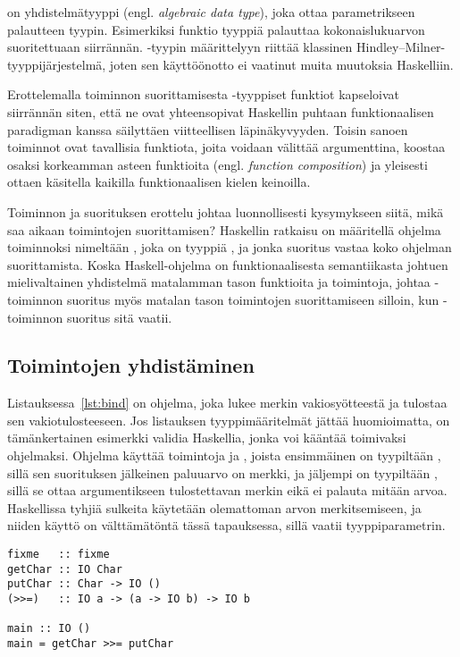 \documentclass[finnish]{tktltiki2}
\begin{document}
 on yhdistelmätyyppi (engl. \emph{algebraic data type}), joka ottaa parametrikseen
palautteen tyypin. Esimerkiksi funktio tyyppiä  palauttaa kokonaislukuarvon
suoritettuaan siirrännän. -tyypin määrittelyyn riittää klassinen
Hindley--Milner-tyyppijärjestelmä, joten sen käyttöönotto ei vaatinut muita muutoksia Haskelliin.

Erottelemalla toiminnon suorittamisesta -tyyppiset funktiot kapseloivat siirrännän siten,
että ne ovat yhteensopivat Haskellin puhtaan funktionaalisen paradigman kanssa säilyttäen
viitteellisen läpinäkyvyyden. Toisin sanoen toiminnot ovat tavallisia funktiota, joita voidaan
välittää argumenttina, koostaa osaksi korkeamman asteen funktioita (engl. \emph{function
composition}) ja yleisesti ottaen käsitella kaikilla funktionaalisen kielen keinoilla.

Toiminnon ja suorituksen erottelu johtaa luonnollisesti kysymykseen siitä, mikä saa aikaan
toimintojen suorittamisen? Haskellin ratkaisu on määritellä ohjelma toiminnoksi nimeltään
, joka on tyyppiä , ja jonka suoritus vastaa koko ohjelman suorittamista.
Koska Haskell-ohjelma on funktionaalisesta semantiikasta johtuen mielivaltainen yhdistelmä
matalamman tason funktioita ja toimintoja, johtaa -toiminnon suoritus myös matalan tason
toimintojen suorittamiseen silloin, kun -toiminnon suoritus sitä vaatii.

%
\subsection{Toimintojen yhdistäminen}

Listauksessa~\ref{lst:bind} on ohjelma, joka lukee merkin vakiosyötteestä ja tulostaa sen
vakiotulosteeseen. Jos listauksen tyyppimääritelmät jättää huomioimatta, on tämänkertainen esimerkki
validia Haskellia, jonka voi kääntää toimivaksi ohjelmaksi. Ohjelma käyttää toimintoja  ja
, joista ensimmäinen on tyypiltään , sillä sen suorituksen
jälkeinen paluuarvo on merkki, ja jäljempi on tyypiltään , sillä se ottaa
argumentikseen tulostettavan merkin eikä ei palauta mitään arvoa. Haskellissa tyhjiä sulkeita
käytetään olemattoman arvon merkitsemiseen, ja niiden käyttö on välttämätöntä tässä tapauksessa,
sillä  vaatii tyyppiparametrin.

\begin{lstlisting}[float,label={lst:bind},caption={Kompositio ja sidosfunktion käyttö}]
fixme   :: fixme
getChar :: IO Char
putChar :: Char -> IO ()
(>>=)   :: IO a -> (a -> IO b) -> IO b

main :: IO ()
main = getChar >>= putChar
\end{lstlisting}
\end{document}
